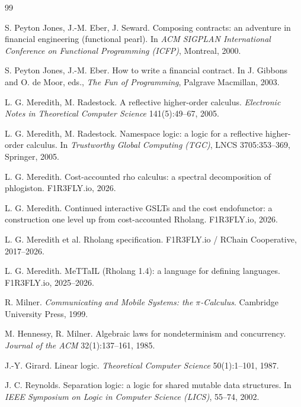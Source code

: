 \documentclass[11pt]{article}
\theoremstyle{definition}
\theoremstyle{plain}
\begin{document}
\begin{thebibliography}{99}\small

S. Peyton Jones, J.-M. Eber, J. Seward.
\newblock Composing contracts: an adventure in financial engineering (functional pearl).
\newblock In \emph{ACM SIGPLAN International Conference on Functional Programming (ICFP)}, Montreal, 2000.

S. Peyton Jones, J.-M. Eber.
\newblock How to write a financial contract.
\newblock In J. Gibbons and O. de Moor, eds., \emph{The Fun of Programming}, Palgrave Macmillan, 2003.

L. G. Meredith, M. Radestock.
\newblock A reflective higher-order calculus.
\newblock \emph{Electronic Notes in Theoretical Computer Science} 141(5):49--67, 2005.

L. G. Meredith, M. Radestock.
\newblock Namespace logic: a logic for a reflective higher-order calculus.
\newblock In \emph{Trustworthy Global Computing (TGC)}, LNCS 3705:353--369, Springer, 2005.

L. G. Meredith.
\newblock Cost-accounted rho calculus: a spectral decomposition of phlogiston.
\newblock F1R3FLY.io, 2026.

L. G. Meredith.
\newblock Continued interactive GSLTs and the cost endofunctor: a construction one level up from
cost-accounted Rholang.
\newblock F1R3FLY.io, 2026.

L. G. Meredith et al.
\newblock Rholang specification.
\newblock F1R3FLY.io / RChain Cooperative, 2017--2026.

L. G. Meredith.
\newblock MeTTaIL (Rholang 1.4): a language for defining languages.
\newblock F1R3FLY.io, 2025--2026.

R. Milner.
\newblock \emph{Communicating and Mobile Systems: the $\pi$-Calculus}.
\newblock Cambridge University Press, 1999.

M. Hennessy, R. Milner.
\newblock Algebraic laws for nondeterminism and concurrency.
\newblock \emph{Journal of the ACM} 32(1):137--161, 1985.

J.-Y. Girard.
\newblock Linear logic.
\newblock \emph{Theoretical Computer Science} 50(1):1--101, 1987.

J. C. Reynolds.
\newblock Separation logic: a logic for shared mutable data structures.
\newblock In \emph{IEEE Symposium on Logic in Computer Science (LICS)}, 55--74, 2002.


\end{thebibliography}
\end{document}
